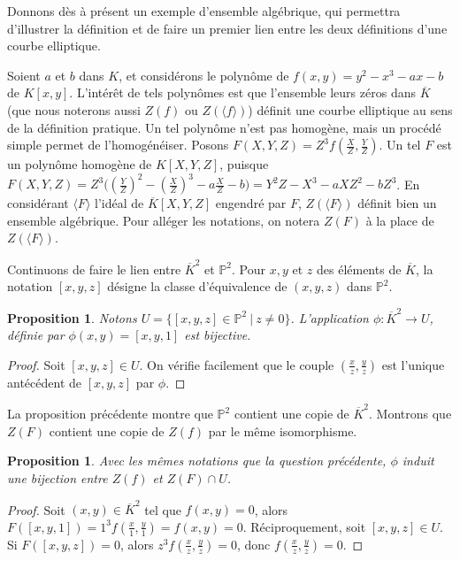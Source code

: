 \documentclass{article}
\theoremstyle{plain}%
\newtheorem{prop}[thm]{Proposition}
\theoremstyle{definition}%
\newcommand{\ol}{\overline}
\begin{document}
Donnons dès à présent un exemple d'ensemble algébrique, qui permettra d'illustrer la définition et de faire un premier lien entre les deux définitions d'une courbe elliptique.

Soient $a$ et $b$ dans $K$, et considérons le polynôme de $f(x, y) = y^2 -x^3 -ax -b$ de $K[x, y]$. 
L'intérêt de tels polynômes est que l'ensemble leurs zéros dans $\ol K$ (que nous noterons aussi $Z(f)$ ou $Z(\langle f \rangle)$) définit une courbe elliptique au sens de la définition pratique.  
Un tel polynôme n'est pas homogène, mais un procédé simple permet de l'homogénéiser. 
Posons $F(X, Y, Z) = Z^3f(\frac{X}{Z}, \frac{Y}{Z})$. 
Un tel $F$ est un polynôme homogène de $K[X, Y, Z]$, puisque $F(X, Y, Z) = Z^3\big((\frac{Y}{Z})^2 - (\frac{X}{Z})^3 -a\frac{X}{Z}-b\big) = Y^2Z - X^3 -aXZ^2 -bZ^3$. 
En considérant $\langle F \rangle$ l'idéal de $\ol K[X, Y, Z]$ engendré par $F$, $Z(\langle F \rangle)$ définit bien un ensemble algébrique. Pour alléger les notations, on notera $Z(F)$ à la place de $Z(\langle F\rangle)$. 

\vspace{0.5em}

Continuons de faire le lien entre $\ol K^2$ et $\mathbb P^2$. Pour $x, y$ et $z$ des éléments de $\ol K$, la notation $[x, y, z]$ désigne la classe d'équivalence de $(x, y, z)$ dans $\mathbb P^2$.

\begin{prop}
 Notons $U = \{[x, y, z]\in \mathbb P^2\ |\ z\neq 0\}$. L'application $\phi : \ol K^2 \to U$, définie par $\phi(x, y) = [x, y, 1]$ est bijective. 
\end{prop}

\begin{proof}
  Soit $[x, y, z]\in U$. On vérifie facilement que le couple $(\frac{x}{z}, \frac{y}{z})$ est l'unique antécédent de $[x, y, z]$ par $\phi$.
\end{proof}

La proposition précédente montre que $\mathbb P^2$ contient une copie de $\ol K^2$. Montrons que $Z(F )$ contient une copie de $Z(f)$ par le même isomorphisme. 

\begin{prop}
  Avec les mêmes notations que la question précédente, $\phi$ induit une bijection entre $Z(f)$ et $Z(F) \cap U$.
\end{prop}

\begin{proof}
  Soit $(x, y)\in\ol K^2$ tel que $f(x, y) = 0$, alors $F([x, y, 1]) = 1^3f(\frac{x}{1}, \frac{y}{1}) = f(x, y) = 0$.
  Réciproquement, soit $[x, y, z]\in U$. Si $F([x, y, z]) = 0$, alors $z^3f(\frac{x}{z}, \frac{y}{z}) = 0$, donc $f(\frac{x}{z}, \frac{y}{z}) = 0$.
\end{proof}
\end{document}
